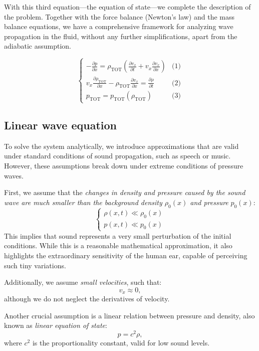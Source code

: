 \documentclass[a4paper]{article}
\begin{document}
With this third equation—the equation of state—we complete the description of the problem. Together with the force balance (Newton's law) and the mass balance equations, we have a comprehensive framework for analyzing wave propagation in the fluid, without any further simplifications, apart from the adiabatic assumption.

\[
\begin{cases}
-\frac{\partial p}{\partial x} = \rho_\text{TOT} \left( \frac{\partial v_x}{\partial t} + v_x \frac{\partial v_x}{\partial x} \right) & \text{(1)} \\
v_x \frac{\partial \rho_\text{TOT}}{\partial x} - \rho_\text{TOT} \frac{\partial v_x}{\partial x} = \frac{\partial \rho}{\partial t} & \text{(2)} \\
p_\text{TOT} = p_\text{TOT}(\rho_\text{TOT}) & \text{(3)}
\end{cases}
\]



\subsection{Linear wave equation}

To solve the system analytically, we introduce approximations that are valid under standard conditions of sound propagation, such as speech or music. However, these assumptions break down under extreme conditions of pressure waves.

First, we assume that the \textit{changes in density and pressure caused by the sound wave are much smaller than the background density \(\rho_0(x)\) and pressure} \(p_0(x)\):
\[
\begin{cases}
\rho(x, t) \ll \rho_0(x) \\
p(x, t) \ll p_0(x)
\end{cases}
\]
This implies that sound represents a very small perturbation of the initial conditions. While this is a reasonable mathematical approximation, it also highlights the extraordinary sensitivity of the human ear, capable of perceiving such tiny variations.

Additionally, we assume \textit{small velocities}, such that:
\[
v_x \approx 0,
\]
although we do not neglect the derivatives of velocity. 

Another crucial assumption is a linear relation between pressure and density, also known as \textit{linear equation of state}:
\[
p = c^2 \rho,
\]
where \(c^2\) is the proportionality constant, valid for low sound levels.
\end{document}

